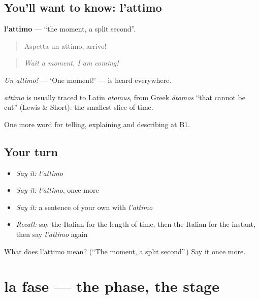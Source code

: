 \subsection*{You'll want to know: l'attimo}
\textbf{l'attimo} — \textquotedblleft{}the moment, a split second\textquotedblright{}.

\begin{quote}
Aspetta un attimo, arrivo!
\end{quote}

\begin{quote}
\emph{Wait a moment, I am coming!}
\end{quote}

\emph{Un attimo!} — ‘One moment!’ — is heard everywhere.

\begin{cousinweb}
\emph{attimo} is usually traced to Latin \emph{atomus}, from Greek \emph{átomos} \textquotedblleft{}that cannot be cut\textquotedblright{} (Lewis \& Short): the smallest slice of time.
\end{cousinweb}

\begin{grammarlens}[title={What you've built}]
One more word for telling, explaining and describing at B1.
\end{grammarlens}

\subsection*{Your turn}
\begin{itemize}
\raggedright
  \item \emph{Say it:} \emph{l'attimo}
  \item \emph{Say it:} \emph{l'attimo}, once more
  \item \emph{Say it:} a sentence of your own with \emph{l'attimo}
  \item \emph{Recall:} say the Italian for the length of time, then the Italian for the instant, then say \emph{l'attimo} again
\end{itemize}

\begin{tcolorbox}[breakable,colback=teal!4,colframe=teal!35!black,title={Before you move on}]
What does l'attimo mean? (\textquotedblleft{}The moment, a split second\textquotedblright{}.) Say it once more.
\end{tcolorbox}
\section[la fase]{la fase — the phase, the stage}

